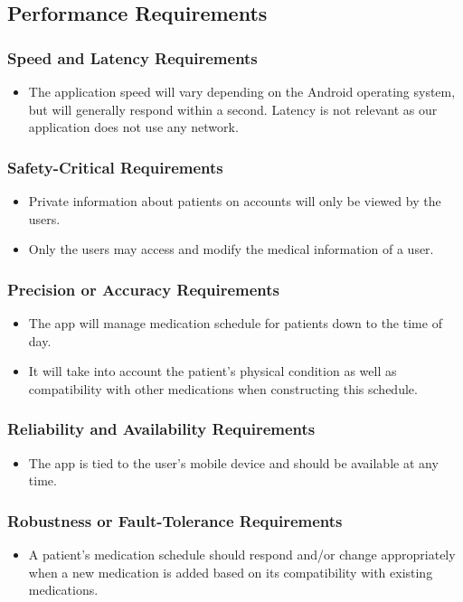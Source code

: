 \documentclass[12pt]{article}
\begin{document}
\subsection{Performance Requirements}
\subsubsection{Speed and Latency Requirements}
\begin{itemize}
\item The application speed will vary depending on the Android operating system, but will generally respond within a second. Latency is not relevant as our application does not use any network.
\end{itemize}

\subsubsection{Safety-Critical Requirements}
\begin{itemize}
\item Private information about patients on accounts will only be viewed by the users.
\item Only the users may access and modify the medical information of a user.
\end{itemize}

\subsubsection{Precision or Accuracy Requirements}
\begin{itemize}
\item The app will manage medication schedule for patients down to the time of day. 
\item It will take into account the patient's physical condition as well as compatibility with other medications when constructing this schedule.
\end{itemize}

\subsubsection{Reliability and Availability Requirements}
\begin{itemize}
\item The app is tied to the user’s mobile device and should be available at any time.
\end{itemize}

\subsubsection{Robustness or Fault-Tolerance Requirements}
\begin{itemize}
\item A patient’s medication schedule should respond and/or change appropriately when a new medication is added based on its compatibility with existing medications.
\end{itemize}
\end{document}
